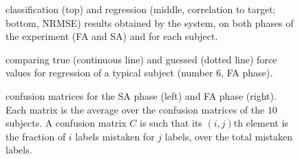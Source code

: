 \documentclass[10pt]{bmc_article}
\def\texttt{[image: ]}
\newenvironment{bmcformat}{\begin{raggedright}\baselineskip20pt\sloppy\setboolean{publ}{false}}{\end{raggedright}\baselineskip20pt\sloppy}
\begin{document}
\begin{bmcformat}

\begin{figure}[!ht] \centering
  \caption{classification (top) and regression (middle, correlation to target;
    bottom, NRMSE) results obtained by the system, on both phases of the
    experiment (FA and SA) and for each subject.}
  \label{fig:results}
\end{figure}

\begin{figure}[!ht] \centering
  \caption{comparing true (continuous line) and guessed (dotted line) force values for regression of a
    typical subject (number $6$, FA phase).}
  \label{fig:examples}
\end{figure}

\begin{figure*}[!ht] \centering
  \caption{confusion matrices for the SA phase (left) and FA phase (right). Each matrix
           is the average over the confusion matrices of the $10$ subjects. A confusion
           matrix $C$ is such that its $(i,j)$th element is the fraction of $i$ labels
           mistaken for $j$ labels, over the total mistaken labels.}
  \label{fig:confusion}
\end{figure*}


\end{bmcformat}
\end{document}
